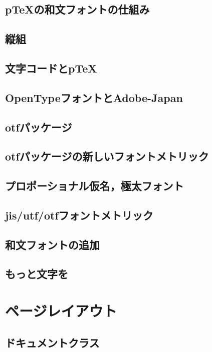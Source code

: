 \documentclass{jsbook}
\begin{document}
\section{pTeXの和文フォントの仕組み}

\section{縦組}

\section{文字コードとpTeX}

\section{OpenTypeフォントとAdobe-Japan}

\section{otfパッケージ}

\section{otfパッケージの新しいフォントメトリック}

\section{プロポーショナル仮名，極太フォント}

\section{jis/utf/otfフォントメトリック}

\section{和文フォントの追加}

\section{もっと文字を}

\chapter{ページレイアウト}

\section{ドキュメントクラス}
\end{document}
